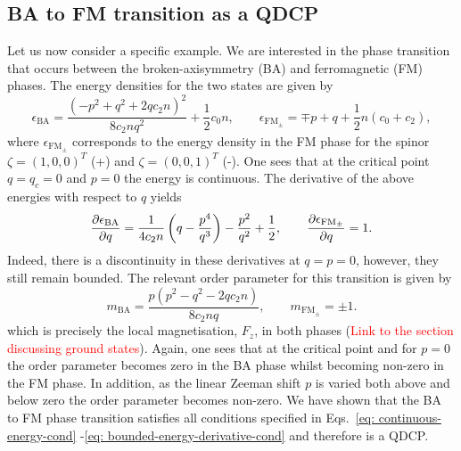 \subsection{BA to FM transition as a QDCP}
Let us now consider a specific example.
We are interested in the phase transition that occurs between the
broken-axisymmetry (BA) and ferromagnetic (FM) phases.
The energy densities for the two states are given by~\cite{Kawaguchi2012}
\begin{equation}
    \epsilon_\mathrm{BA} = \frac{{(-p^2 + q^2 +2qc_2n)}^2}{8c_2nq^2} 
    + \frac{1}{2}c_0n, \qquad
    \epsilon_\mathrm{FM_{\pm}} = \mp p + q + \frac{1}{2}n(c_0 + c_2),
\end{equation}
where \( \epsilon_\mathrm{FM_{\pm}} \) corresponds to the energy density in the
FM phase for the spinor \( \zeta = {(1, 0, 0)}^T \) (+) and
\( \zeta = {(0, 0, 1)}^T \) (-).
One sees that at the critical point \( q=q_c=0 \) and \( p=0 \) the energy is
continuous.
The derivative of the above energies with respect to \( q \) yields
\begin{equation}
    \pdv{\epsilon_\mathrm{BA}}{q} = 
    \frac{1}{4c_2n}\left(q - \frac{p^4}{q^3}\right) - \frac{p^2}{q^2}
    + \frac{1}{2},
    \qquad
    \pdv{\epsilon_\mathrm{FM_{\pm}}}{q} = 1.
\end{equation}
Indeed, there is a discontinuity in these derivatives at \( q=p=0 \), however,
they still remain bounded.
The relevant order parameter for this transition is given by
\begin{equation}
    m_\mathrm{BA} = \frac{p(p^2 - q^2 - 2qc_2n)}{8c_2nq},
    \qquad
    m_{\mathrm{FM}_{\pm}} = \pm 1.
\end{equation}
which is precisely the local magnetisation, \( F_z \), in both phases
(\textcolor{red}{Link to the section discussing ground states}).
Again, one sees that at the critical point and for \( p=0 \) the order parameter
becomes zero in the BA phase whilst becoming non-zero in the FM phase.
In addition, as the linear Zeeman shift \( p \) is varied both above and below
zero the order parameter becomes non-zero.
We have shown that the BA to FM phase transition satisfies all conditions
specified in Eqs.~\eqref{eq: continuous-energy-cond}
-\eqref{eq: bounded-energy-derivative-cond}
and therefore is a QDCP\@.

